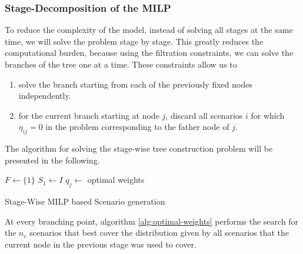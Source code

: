 \begin{comment}
  The size of this mathematical program is prohibitively large. Common orders of magnitude for the cardinality of the set of scenarios is well above 1000. The tree size is dictated by the choice of $n_c$ and the time represented by the number of time steps $n_s$ one wants to look into the future. Even for very short times like $n_c=4$ and five branches to each node, the number of nodes quickly goes up to $n_N=155$. This leads to an MILP with $n_N\cdot n_s=155,000$, which means that it is computationally intractable. The intractability is not only due to the sheer size, but to the combination with the fact that the problem has a very weak relaxation.
\end{comment}
\subsubsection{Stage-Decomposition of the MILP}
To reduce the complexity of the model, instead of solving all stages at the same time, we will solve the problem stage by stage. This greatly reduces the computational burden, because using the filtration constraints, we can solve the branches of the tree one at a time. These constraints allow us to 
\begin{enumerate}
\item solve the branch starting from each of the previously fixed nodes independently.
\item for the current branch starting at node $j$, discard all scenarios $i$ for which $\eta_{ij}=0$ in the problem corresponding to the father node of $j$.
\end{enumerate}

The algorithm for solving the stage-wise tree construction problem will be presented in the following.
\begin{algorithm}
  $F \leftarrow \{1\}$
  $S_1 \leftarrow I$
  $q_j\leftarrow $ optimal weights 
  \caption{Stage-Wise MILP based Scenario generation}
  \label{alg:stage-wise-milp}
\end{algorithm}
At every branching point, algorithm \ref{alg:optimal-weights} performs the search for the $n_c$ scenarios that best cover the distribution given by all scenarios that the current node in the previous stage was used to cover.

